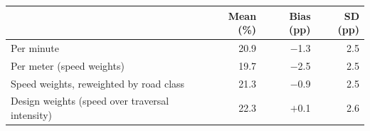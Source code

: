 \begin{tabular}{lrrr}
\toprule
 & Mean (\%) & Bias (pp) & SD (pp) \\
\midrule
Per minute & 20.9 & $-$1.3 & 2.5 \\
Per meter (speed weights) & 19.7 & $-$2.5 & 2.5 \\
Speed weights, reweighted by road class & 21.3 & $-$0.9 & 2.5 \\
Design weights (speed over traversal intensity) & 22.3 & $+$0.1 & 2.6 \\
\bottomrule
\end{tabular}
